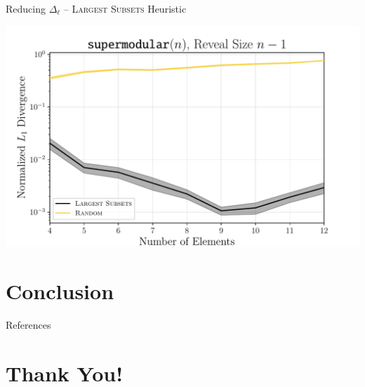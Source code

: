 \documentclass[aspectratio=169]{beamer}
\begin{document}
\begin{frame}{Reducing $ \Delta_\ell $ -- \textsc{Largest Subsets} Heuristic}
	\begin{center}
		\includegraphics[width=.8\textwidth]{figures/l1_norm_convex_linear.pdf}
	\end{center}
\end{frame}

\section{Conclusion}

\begin{frame}[allowframebreaks]{References}
    \nocite{*}
    \printbibliography[heading=none]
\end{frame}

\section{Thank You!}
\end{document}
